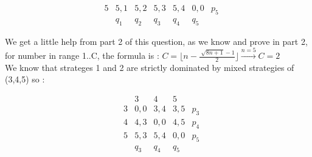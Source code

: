 \begin{enumerate}
\begin{latin}
\begin{center}
\begin{equation*}
\begin{matrix}
                                      & 5 & 5,1 & 5,2 & 5,3 & 5,4 & 0,0  & p_5 \\
                                      &  & q_1 & q_2 & q_3 & q_4 & q_5 
                                      \end{matrix}
                                \end{equation*}
                           \end{center}
                We get a little help from part 2 of this question, as we know and prove in part 2, 
                for number in range 1..C, the formula is : $C = \lfloor n - \frac{\sqrt[]{8n+1}-1}{2} \rfloor \xrightarrow{n=5} C = 2$ \\
                We know that strateges 1 and 2 are strictly dominated by mixed strategies of (3,4,5) so : 
                \begin{center}
                    \begin{equation*}
                                     \begin{matrix}
                                        & & 3 & 4 & 5            \\
                                      & 3 & 0,0 & 3,4 & 3,5 & p_3\\
                                      & 4 & 4,3 & 0,0 & 4,5 & p_4\\
                                      & 5 & 5,3 & 5,4 & 0,0  & p_5 \\
                                      &   & q_3 & q_4 & q_5 
                                      \end{matrix}
                                \end{equation*}
                               

\end{center}
\end{latin}
\end{enumerate}

